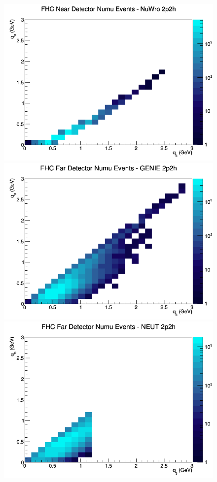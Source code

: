 \begin{figure}[h]
\includegraphics[width=\linewidth]{q0_q3/nominal/2p2h_FHC_ND_numu_q3_q0_NuWro.png}
\endminipage
\newline
{}
\includegraphics[width=\linewidth]{q0_q3/nominal/2p2h_FHC_FD_numu_q3_q0_GENIE.png}
\endminipage
{}
\includegraphics[width=\linewidth]{q0_q3/nominal/2p2h_FHC_FD_numu_q3_q0_NEUT.png}

\end{figure}
